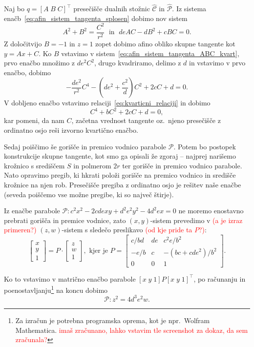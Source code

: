 Naj bo $q = [A\;B\; C]^\intercal$ presečišče dualnih stožnic $\mathcal{\hat{C}}$ in $\mathcal{\hat{P}}$. Iz sistema enačb~\ref{eq:afin_sistem_tangenta_splosen} dobimo nov sistem
\begin{equation}
    \label{eq:afin_sistem_tangenta_ABC_kvart}
    A^2 + B^2 = \frac{C^2}{r^2} \; \text{ in } \; deAC - dB^2 + cBC = 0.
\end{equation}
Z določitvijo $B = -1$ in $z = 1$ zopet dobimo afino obliko skupne tangente kot $y = Ax + C$. Ko $B$ vstavimo v sistem~\ref{eq:afin_sistem_tangenta_ABC_kvart}, prvo enačbo množimo z $de^2C^2$, drugo kvadriramo, delimo z $d$ in vstavimo v prvo enačbo, dobimo
$$ - \frac{de^2}{r^2}C^4 - (de^2 + \frac{c^2}{d})C^2 + 2cC + d = 0.$$
V dobljeno enačbo vstavimo relaciji~\ref{eq:kvarticni_relaciji} in dobimo
$$C^4 + bC^2 + 2cC + d = 0,$$
kar pomeni, da nam $C$, začetna vrednost tangente oz.\ njeno presečišče z ordinatno osjo reši izvorno kvartično enačbo.

Sedaj poiščimo še gorišče in premico vodnico parabole $\mathcal{P}$. Potem bo postopek konstrukcije skupne tangente, kot smo ga opisali že zgoraj -- najprej narišemo krožnico s središčem $S$ in polmerom $2r$ ter gorišče in premico vodnico parabole. Nato opravimo pregib, ki hkrati položi gorišče na premico vodnico in središče krožnice na njen rob. Presečišče pregiba z ordinatno osjo je rešitev naše enačbe (seveda poiščemo vse možne pregibe, ki so največ štirje).

Iz enačbe parabole $\mathcal{P}: c^2x^2 - 2cdexy + d^2e^2y^2 - 4d^2ex = 0$ ne moremo enostavno prebrati gorišča in premice vodnice, zato $(x, y)$-sistem prevedimo v \textcolor{red}{(a je izraz primeren?)} $(z, w)$-sistem s sledečo preslikavo \textcolor{red}{(od kje pride ta $P$?)}:
$$ \begin{bmatrix} x\\y\\1\end{bmatrix} = P \cdot \begin{bmatrix} z\\w\\1\end{bmatrix}, \text{ kjer je } P =
\begin{bmatrix}
    c/bd & de & c^2e/b^2\\
    -e/b & c & -(bc + cde^2)/b^2\\
    0 & 0 & 1
\end{bmatrix}.
$$

Ko to vstavimo v matrično enačbo parabole $[x\;y\;1] P [x\;y\;1]^\intercal$, po računanju in poenostavljanju\footnote{Za izračun je potrebna programska oprema, kot je npr.\ Wolfram Mathematica. \textcolor{red}{imaš zračunano, lahko vstavim tle screenshot za dokaz, da sem zračunala?}} na koncu dobimo
$$ \mathcal{P}: z^2 = 4d^3e^2w. $$

